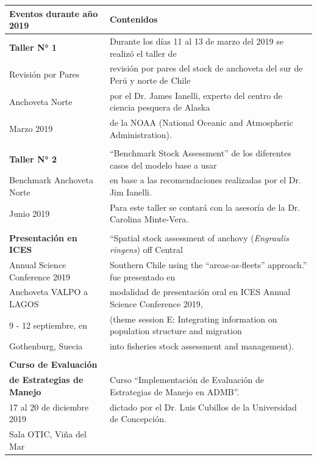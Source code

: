 \documentclass[
  spanish,
]{article}
\begin{document}
\begin{table}[h]
  \centering
  \resizebox{16cm}{!} {
  \begin{tabular}{|l|l|}
  \hline
  Eventos durante año 2019          &  Contenidos \\ \hline
  \textbf{Taller N° 1}              & Durante los días 11 al 13 de marzo del 2019 se realizó el taller de \\
  Revisión por Pares                & revisión por pares del stock de anchoveta del sur de Perú y norte de Chile \\
  Anchoveta Norte                   & por el Dr. James Ianelli, experto del centro de ciencia pesquera de Alaska \\
  Marzo 2019                        & de la NOAA (National Oceanic and Atmospheric Administration). \\
                                    & \\ \hline
  \textbf{Taller N° 2}              & “Benchmark Stock Assessment” de los diferentes casos del modelo base a usar \\ 
  Benchmark Anchoveta Norte         & en base a las recomendaciones realizadas por el Dr. Jim Ianelli. \\
  Junio 2019                          & Para este taller se contará con la asesoría de la Dr. Carolina Minte-Vera. \\
                                    & \\ \hline
  \textbf{Presentación en ICES}     & “Spatial stock assessment of anchovy (\textit{Engraulis ringens}) off Central \\
  Annual Science Conference 2019    & Southern Chile using the “areas-as-fleets” approach.” fue presentado en \\ 
  Anchoveta VALPO a LAGOS           & modalidad de presentación oral en ICES Annual Science Conference 2019, \\
  9 - 12 septiembre, en             & (theme session E: Integrating information on population structure and migration \\
  Gothenburg, Suecia                & into fisheries stock assessment and management). \\ 
                                    & \\ \hline
  \textbf{Curso de Evaluación}      &  \\
  \textbf{de Estrategias de Manejo} & Curso “Implementación de Evaluación de Estrategias de Manejo en ADMB”. \\
  17 al 20 de diciembre 2019        & dictado por el Dr. Luis Cubillos de la Universidad de Concepción. \\
  Sala OTIC, Viña del Mar           &   \\ \hline
  \end{tabular}}
    \end{table}
\end{document}
